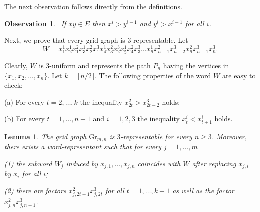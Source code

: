 \documentclass[11pt]{article}
\newtheorem{lemma}[theorem]{Lemma}
\newtheorem{Fact}[theorem]{Observation}
\begin{document}
The next observation follows directly from the definitions.

\begin{Fact}~\label{evident}
If $xy\in E$ then $x^i>y^{i-1}$ and $y^i>x^{i-1}$ for all $i$.
\end{Fact}

Next, we prove that every grid graph is 3-representable. Let
$$W=x_1^1x_2^1x_1^2x_3^1x_2^2x_1^3x_4^1x_3^2x_2^3x_5^1x_4^2x_3^3\ldots x_{n}^1x_{n-1}^2x_{n-2}^3x_{n}^2x_{n-1}^3x_{n}^3.$$

Clearly, \( W \) is 3-uniform and represents the path \( P_n \) having the vertices in $\{x_1,x_2,\ldots,x_n\}$. Let $k=\lfloor n/2 \rfloor$. The following properties of the word $W$ are easy to check:

(a) For every $t = 2, \ldots, k$ the inequality $x_{2t}^2 > x_{2t-2}^3$ holds;

(b) For every $t = 1, \ldots, n-1$ and $i=1,2,3$ the inequality $x_t^i < x_{t+1}^i$ holds.




\begin{lemma}\label{main}  The grid graph $\mathrm{Gr}_{m,n}$ is $3$-representable for every $n \ge 3$. Moreover, there exists a word-representant such that for every $j=1,\ldots,m$

{\rm (1)} the subword $W_j$ induced by $x_{j,1},\ldots,x_{j,n}$ coincides with $W$ after replacing $x_{j,i}$ by $x_i$ for all $i$;

{\rm (2)} there are factors  $x_{j,2t+1}^2 x_{j,2t}^3$ for all $t = 1, \ldots, k - 1$ as well as the factor $x_{j,n}^2x_{j,n-1}^3$.
\end{lemma}


\end{document}
